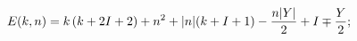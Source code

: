 \begin{equation}
E(k,n)=k\left(k+2I+2\right) 
+n^2+|n|(k+I+1)-{n|Y|\over 2}+I\mp{Y \over 2};\\
\end{equation}

